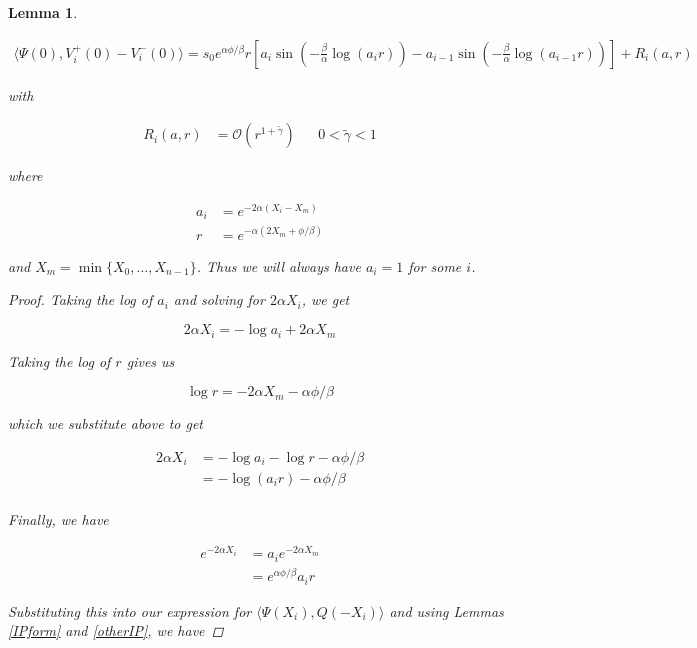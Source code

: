 \documentclass[12pt]{article}
\newtheorem{lemma}{Lemma}
\begin{document}

\begin{lemma}\label{rewritewithr}

\begin{align*}
\langle \Psi(0), V_i^+(0) - V_i^-(0) \rangle = 
s_0 e^{\alpha \phi / \beta } r \left[ a_i \sin \left( - \frac{\beta}{\alpha} \log (a_i r) \right) - a_{i-1} \sin \left( - \frac{\beta}{\alpha} \log (a_{i-1} r) \right) \right] + R_i(a, r)
\end{align*}

with 

\begin{align*}
R_i(a, r) &= \mathcal{O}(r^{1 + \tilde{\gamma}}) && 0 < \tilde{\gamma} < 1
\end{align*}

where 

\begin{align*}
a_i &= e^{-2 \alpha (X_i - X_m)} \\
r &= e^{-\alpha( 2 X_m + \phi / \beta ) }
\end{align*}

and $X_m = \min \{ X_0, \dots, X_{n-1} \}$. Thus we will always have $a_i = 1$ for some $i$.

\begin{proof}

Taking the log of $a_i$ and solving for $2 \alpha X_i$, we get

\[
2 \alpha X_i = -\log a_i + 2 \alpha X_m
\]

Taking the log of $r$ gives us

\[
\log r = -2 \alpha X_m - \alpha \phi / \beta
\]

which we substitute above to get

\begin{align*}
2 \alpha X_i &= -\log a_i - \log r - \alpha \phi / \beta \\
&= -\log (a_i r) - \alpha \phi / \beta \\
\end{align*}

Finally, we have

\begin{align*}
e^{-2 \alpha X_i} &= a_i e^{-2 \alpha X_m} \\
&= e^{\alpha \phi / \beta } a_i r
\end{align*}

Substituting this into our expression for $\langle \Psi(X_i), Q(-X_i) \rangle$ and using Lemmas \ref{IPform} and \ref{otherIP}, we have


\end{proof}
\end{lemma}
\end{document}
